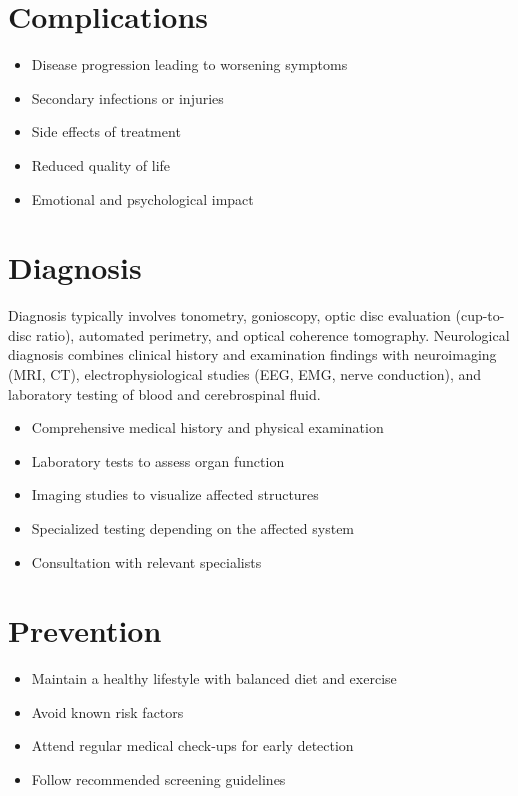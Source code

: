 \section{Complications}
\begin{itemize}[noitemsep]
  \item Disease progression leading to worsening symptoms
  \item Secondary infections or injuries
  \item Side effects of treatment
  \item Reduced quality of life
  \item Emotional and psychological impact
\end{itemize}
\section{Diagnosis}
Diagnosis typically involves tonometry, gonioscopy, optic disc evaluation (cup-to-disc ratio), automated perimetry, and optical coherence tomography. Neurological diagnosis combines clinical history and examination findings with neuroimaging (MRI, CT), electrophysiological studies (EEG, EMG, nerve conduction), and laboratory testing of blood and cerebrospinal fluid.

\begin{itemize}[noitemsep]
  \item Comprehensive medical history and physical examination
  \item Laboratory tests to assess organ function
  \item Imaging studies to visualize affected structures
  \item Specialized testing depending on the affected system
  \item Consultation with relevant specialists
\end{itemize}
\section{Prevention}
\begin{itemize}[noitemsep]
  \item Maintain a healthy lifestyle with balanced diet and exercise
  \item Avoid known risk factors
  \item Attend regular medical check-ups for early detection
  \item Follow recommended screening guidelines
\end{itemize}

